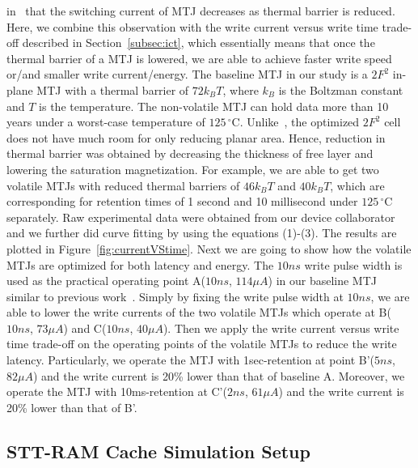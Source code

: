 in~\cite{PMTJ:Toshiba08} that the switching current of MTJ decreases as thermal barrier is reduced. Here, we combine this observation with the write current versus write time trade-off described in Section~\ref{subsec:ict}, which essentially means that once the thermal barrier of a MTJ is lowered, we are able to achieve faster write speed or/and smaller write current/energy. The baseline MTJ in our study is a $2F^2$ in-plane MTJ with a thermal barrier of $72k_{B}T$, where $k_{B}$ is the Boltzman constant and $T$ is the temperature. The non-volatile MTJ can hold data more than 10 years under a worst-case temperature of $125\,^{\circ}\mathrm{C}$. Unlike~\cite{STTRAM:HPCA11}, the optimized $2F^2$ cell does not have much room for only reducing planar area. Hence, reduction in thermal barrier was obtained by decreasing the thickness of free layer and lowering the saturation magnetization. For example, we are able to get two volatile MTJs with reduced thermal barriers of $46k_{B}T$ and $40k_{B}T$, which are corresponding for retention times of 1 second and 10 millisecond under $125\,^{\circ}\mathrm{C}$ separately. Raw experimental data were obtained from our device collaborator and we further did curve fitting by using the equations (1)-(3). The results are plotted in Figure~\ref{fig:currentVStime}. Next we are going to show how the volatile MTJs are optimized for both latency and energy. The $10ns$ write pulse width is used as the practical operating point A($10ns$, $114\mu A$) in our baseline MTJ similar to previous work~\cite{CACTI:DAC08:Dong}. Simply by fixing the write pulse width at $10ns$, we are able to lower the write currents of the two volatile MTJs which operate at B($10ns$, $73\mu A$) and C($10ns$, $40\mu A$). Then we apply the write current versus write time trade-off on the operating points of the volatile MTJs to reduce the write latency. Particularly, we operate the MTJ with 1sec-retention at point B'($5ns$, $82\mu A$) and the write current is 20\% lower than that of baseline A. Moreover, we operate the MTJ with 10ms-retention at C'($2ns$, $61\mu A$) and the write current is 20\% lower than that of B'.


\subsection{STT-RAM Cache Simulation Setup}

